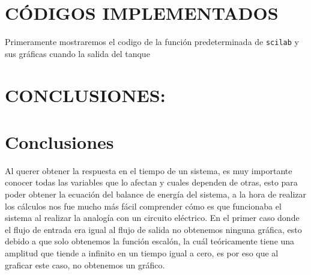 \documentclass[letterpaper,10pt]{article}
\begin{document}
	\section{CÓDIGOS IMPLEMENTADOS}
	Primeramente mostraremos el codigo de la función predeterminada de \texttt{scilab} y sus gráficas cuando la salida del tanque 
	\section{CONCLUSIONES:}
	



	
	
	
%	
\section{Conclusiones}
Al querer obtener la respuesta en el tiempo de un sistema, es muy importante conocer todas las variables que lo
afectan y cuales dependen de otras, esto para poder obtener la ecuación del balance de energía del sistema, a la 
hora de realizar los cálculos nos fue mucho más fácil comprender cómo es que funcionaba el sistema al realizar la
analogía con un circuito eléctrico. En el primer caso donde el flujo de entrada era igual al flujo de salida
no obtenemos ninguna gráfica, esto debido a que solo obtenemos la función escalón, la cuál teóricamente tiene una 
amplitud que tiende a infinito en un tiempo igual a cero, es por eso que al graficar este caso, no obtenemos un gráfico.
\end{document}
